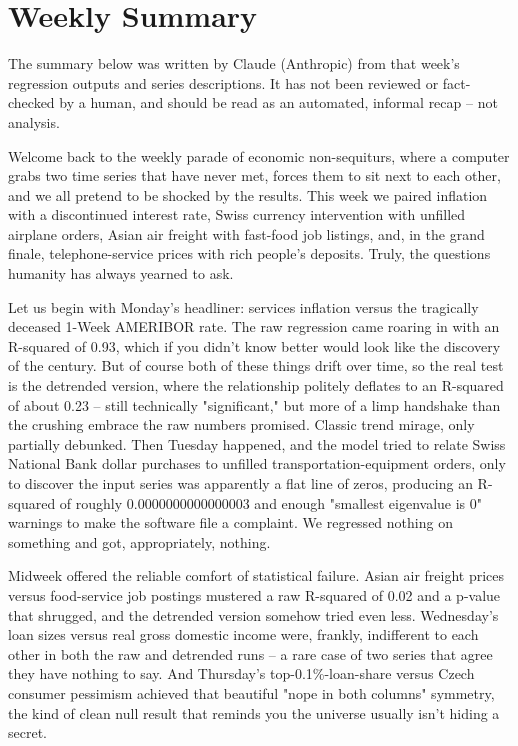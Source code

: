 \section{Weekly Summary}

\begin{tcolorbox}[colback=yellow!10,colframe=black!50,title=AI-Generated Content]
\noindent The summary below was written by Claude (Anthropic) from that week's regression outputs and series descriptions. It has not been reviewed or fact-checked by a human, and should be read as an automated, informal recap -- not analysis.
\end{tcolorbox}

Welcome back to the weekly parade of economic non-sequiturs, where a computer grabs two time series that have never met, forces them to sit next to each other, and we all pretend to be shocked by the results. This week we paired inflation with a discontinued interest rate, Swiss currency intervention with unfilled airplane orders, Asian air freight with fast-food job listings, and, in the grand finale, telephone-service prices with rich people's deposits. Truly, the questions humanity has always yearned to ask.

Let us begin with Monday's headliner: services inflation versus the tragically deceased 1-Week AMERIBOR rate. The raw regression came roaring in with an R-squared of 0.93, which if you didn't know better would look like the discovery of the century. But of course both of these things drift over time, so the real test is the detrended version, where the relationship politely deflates to an R-squared of about 0.23 -- still technically "significant," but more of a limp handshake than the crushing embrace the raw numbers promised. Classic trend mirage, only partially debunked. Then Tuesday happened, and the model tried to relate Swiss National Bank dollar purchases to unfilled transportation-equipment orders, only to discover the input series was apparently a flat line of zeros, producing an R-squared of roughly 0.0000000000000003 and enough "smallest eigenvalue is 0" warnings to make the software file a complaint. We regressed nothing on something and got, appropriately, nothing.

Midweek offered the reliable comfort of statistical failure. Asian air freight prices versus food-service job postings mustered a raw R-squared of 0.02 and a p-value that shrugged, and the detrended version somehow tried even less. Wednesday's loan sizes versus real gross domestic income were, frankly, indifferent to each other in both the raw and detrended runs -- a rare case of two series that agree they have nothing to say. And Thursday's top-0.1\%-loan-share versus Czech consumer pessimism achieved that beautiful "nope in both columns" symmetry, the kind of clean null result that reminds you the universe usually isn't hiding a secret.

